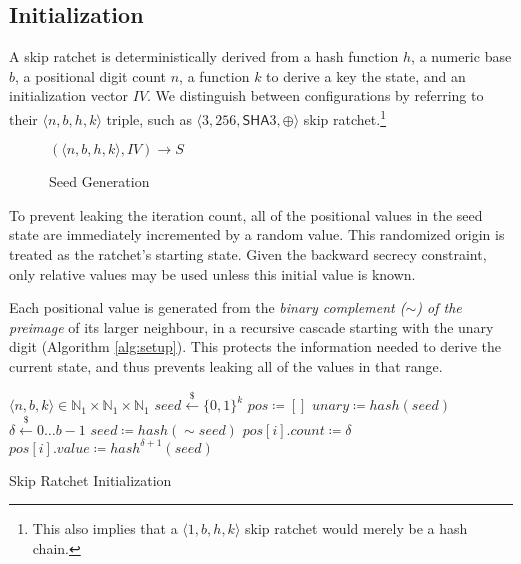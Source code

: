 \documentclass{article}
\begin{document}
	\subsection{Initialization}
	
	A skip ratchet is deterministically derived from a hash function $h$, a numeric base $b$, a positional digit count $n$, a function $k$ to derive a key the state, and an initialization vector $IV$. We distinguish between configurations by referring to their $\langle n, b, h, k \rangle$ triple, such as $\langle 3, 256, \textsf{SHA}3, \oplus \rangle$ skip ratchet.\footnote{This also implies that a $\langle 1, b, h, k \rangle$ skip ratchet would merely be a hash chain.}

	\begin{figure}[h]
		\centering
	
		$(\langle n, b, h, k \rangle, IV) \rightarrow S$
	
		\caption{Seed Generation}
		\label{fig:config}
	\end{figure}
	
	To prevent leaking the iteration count, all of the positional values in the seed state are immediately incremented by a random value. This randomized origin is treated as the ratchet's starting state. Given the backward secrecy constraint, only relative values may be used unless this initial value is known.
	
	Each positional value is generated from the \emph{binary complement ($\sim$) of the preimage} of its larger neighbour, in a recursive cascade starting with the unary digit (Algorithm \ref{alg:setup}). This protects the information needed to derive the current state, and thus prevents leaking all of the values in that range.
		
	\begin{algorithm}
		\begin{algorithmic}[1]
			\Require $\langle n, b, k \rangle \in \mathbb{N}_{1}\times{\mathbb{N}_{1}\times{\mathbb{N}_{1}}}$
			\State $seed \overset{\$}{\gets} \lbrace 0, 1 \rbrace^{k}$
			\State $pos   \coloneqq []$
			\State $unary \coloneqq hash(seed)$
			 
				\State $\delta \overset{\$}{\gets} 0\ldots{b - 1}$
				\State $seed \coloneqq hash(\sim{seed})$ 
				\State $pos[i].count \coloneqq \delta$
				\State $pos[i].value \coloneqq hash^{\delta + 1}(seed)$
			\EndFor
			\\
		\end{algorithmic}
	
		\caption{Skip Ratchet Initialization}
		\label{alg:setup}
	\end{algorithm}
\end{document}
